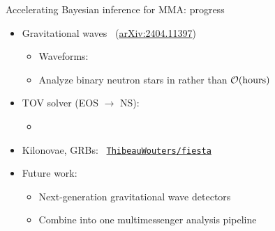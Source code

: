 \documentclass[usenames,dvipsnames,t]{beamer}
\begin{document}
\begin{frame}{Accelerating Bayesian inference for MMA: progress}

  \def\x{4mm}
  \def\y{2mm}

  \begin{itemize}

    \item Gravitational waves \small ~(\href{https://arxiv.org/abs/2404.11397}{arXiv:2404.11397}) \normalsize 
    \vspace{\y}
    \begin{itemize}
      \item Waveforms: 
      
      \vspace{\y}

      \item Analyze binary neutron stars in  rather than $\mathcal{O}(\rm{hours})$ 
    \end{itemize}

    \pause
    \vspace{\x}

    \item TOV solver (EOS $\rightarrow$ NS):
    \vspace{\y}
    \begin{itemize}
      \item {}
    \end{itemize}

    \pause
    \vspace{\x}

    \item Kilonovae, GRBs: \small \faGithub~\href{https://github.com/ThibeauWouters/fiesta}{\texttt{ThibeauWouters/fiesta}} \normalsize

    \pause
    \vspace{\x}

    \item Future work: 
    \vspace{\y}
    \begin{itemize}
      \item Next-generation gravitational wave detectors
      
      \vspace{\y}

      \item Combine into one multimessenger analysis pipeline
    \end{itemize}
  \end{itemize}


\end{frame}
\end{document}
